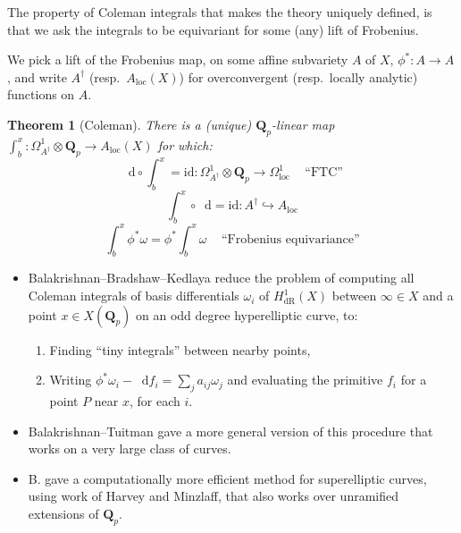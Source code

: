 \documentclass[oneside,11pt,]{article}
\newtheorem{theorem}{Theorem}
\newcommand{\diff}{\mathop{}\!\mathrm{d}}
\newcommand{\ZZ}{\mathbf{Z}}
\newcommand{\QQ}{\mathbf{Q}}
\begin{document}
The property of Coleman integrals that makes the theory uniquely defined, is that we ask the integrals to be equivariant for some (any) lift of Frobenius.


    We pick a lift of the Frobenius map, on some affine subvariety $A$ of $X$, \(\phi^*\colon A \to A\), and write \(A^\dagger\) (resp.\ \(A_{\text{loc}}(X)\)) for overconvergent (resp.\ locally analytic) functions on \(A\).
    \begin{theorem}[{Coleman}]
        There is a (unique) \(\QQ_p\)-linear map \(\int_b^x\colon \Omega_{A^\dagger}^1\otimes \QQ_p \to A_\mathrm{loc} (X)\) for which:\leavevmode%
        \[\diff \circ \int_b^x = \mathrm{id}\colon \Omega_{A^\dagger}^1\otimes \QQ_p \to \Omega_{\text{loc}}^1\,\quad\text{``FTC''}\]%
        \[\int_b^x\circ\diff = \mathrm{id}\colon A^\dagger \hookrightarrow A_{\mathrm{loc}}\]%
        \[\int_b^x \phi^*\omega = \phi^*\int_b^x \omega\,\quad\text{``Frobenius equivariance''}\]%
    \end{theorem}

    \begin{itemize}
        \item Balakrishnan--Bradshaw--Kedlaya reduce the problem of computing all Coleman integrals of basis differentials \(\omega_i\) of \(H^1_{\mathrm{dR}}(X)\) between \(\infty\in X\) and a point \(x\in X(\QQ_p)\) on an odd degree hyperelliptic curve, to:
    \begin{enumerate}
        \item Finding ``tiny integrals'' between nearby points,
        \item Writing \(\phi^*\omega_i  - \diff f_i=\sum_j a_{ij}\omega_j \) and evaluating the primitive \(f_i\) for a point \(P\) near \(x\), for each \(i\).
    \end{enumerate}
        \item Balakrishnan--Tuitman gave a more general version of this procedure that works on a very large class of curves.
        \item B. gave a computationally more efficient method for superelliptic curves, using work of Harvey and Minzlaff, that also works over unramified extensions of $\QQ_p$.
    \end{itemize}

\end{document}
